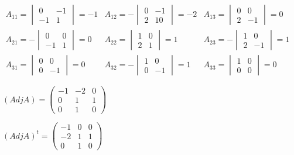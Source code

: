 \begin{ejemplo}
\begin{enumerate}[label=\alph* )]
$\begin{matrix}
A_ {11}=\begin{vmatrix}
0 & -1 \\
-1 & 1
\end{vmatrix}=-1 & A_ {12}=-\begin{vmatrix}
0 & -1 \\
2 & 1
0\end{vmatrix}=-2 & A_ {13}=\begin{vmatrix}
0 & 0 \\
2 & -1
\end{vmatrix}=0 \\
A_ {21}=-\begin{vmatrix}
0 & 0 \\
-1 & 1
\end{vmatrix}=0 & A_ {22}=\begin{vmatrix}
1 & 0 \\
2 & 1
\end{vmatrix}=1 & A_ {23}=-\begin{vmatrix}
1 & 0 \\
2 & -1
\end{vmatrix}=1 \\
A_ {31}=\begin{vmatrix}
0 & 0 \\
0 & -1
\end{vmatrix}=0 & A_ {32}=-\begin{vmatrix}
1 & 0 \\
0 & -1
\end{vmatrix}=1 & A_ {33}=\begin{vmatrix}
1 & 0 \\
0 & 0
\end{vmatrix}=0
\end{matrix} $

$(Adj A)= \begin{pmatrix}
-1 & -2 & 0 \\
0 & 1 & 1 \\
0 & 1 & 0
\end{pmatrix} $

$\left( Adj A \right)^t=\begin{pmatrix}
-1 & 0 & 0 \\
-2 & 1 & 1 \\
0 & 1 & 0
\end{pmatrix}  $


\end{enumerate}
\end{ejemplo}
